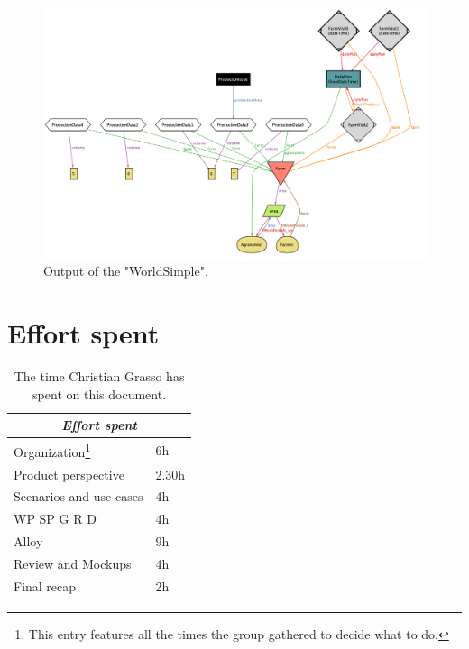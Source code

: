 \documentclass{article}
\begin{document}
\clearpage
\newpage
\clearpage
\begin{figure}
    \centering
    \includegraphics[scale=0.45]{alloy output/worldsimple.png}
    \caption{Output of the "WorldSimple".}
\end{figure}
\clearpage
\section{Effort spent}
\centering
\begin{longtable}{|m{5cm}|m{5cm}|}
\caption{The time Christian Grasso has spent on this document.}
 \label{christian effort spent}
 \hline
 \multicolumn{2}{|c|}{\cellcolor{white}\emph{Effort spent}} \\
 \endfirsthead
 \endhead
 \endfoot
 \endlastfoot
 \hline
 Organization\footnote{This entry features all the times the group gathered to decide what to do.} & 6h\\
 \hline
 Product perspective & 2.30h\\
 \hline
 Scenarios and use cases & 4h\\
 \hline
 WP SP G R D & 4h\\
 \hline
 Alloy & 9h\\
 \hline
 Review and Mockups & 4h\\
 \hline
 Final recap & 2h\\
 \hline
\end{longtable}
\end{document}
